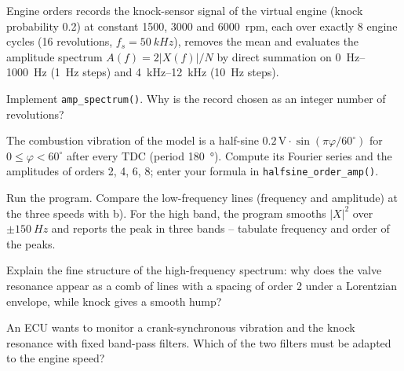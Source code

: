 \begin{exercise}{Engine orders}{\JSLinux}
 records the knock-sensor signal of the
virtual engine (knock probability 0.2) at constant 1500, 3000 and
\SI{6000}{rpm}, each over exactly 8 engine cycles (16 revolutions,
$f_s=\SI{50}{kHz}$), removes the mean and evaluates the amplitude spectrum
$A(f)=2|X(f)|/N$ by direct summation on \SIrange{0}{1000}{Hz} (\SI{1}{Hz}
steps) and \SIrange{4}{12}{kHz} (\SI{10}{Hz} steps).
\begin{tasks}
  \item Implement \texttt{amp\_spectrum()}. Why is the record chosen as an
    integer number of revolutions?
  \item The combustion vibration of the model is a half-sine
    $0.2\,\text{V}\cdot\sin(\pi\varphi/60^\circ)$ for
    $0\le\varphi<60^\circ$ after every TDC (period \SI{180}{\degree}).
    Compute its Fourier series and the amplitudes of orders 2, 4, 6, 8;
    enter your formula in \texttt{halfsine\_order\_amp()}.
  \item Run the program. Compare the low-frequency lines (frequency and
    amplitude) at the three speeds with b). For the high band, the program
    smooths $|X|^2$ over $\pm\SI{150}{Hz}$ and reports the peak in three
    bands -- tabulate frequency and order of the peaks.
  \item Explain the fine structure of the high-frequency spectrum: why does
    the valve resonance appear as a comb of lines with a spacing of order 2
    under a Lorentzian envelope, while knock gives a smooth hump?
  \item An ECU wants to monitor a crank-synchronous vibration and the knock
    resonance with fixed band-pass filters. Which of the two filters must be
    adapted to the engine speed?
\end{tasks}
\end{exercise}

